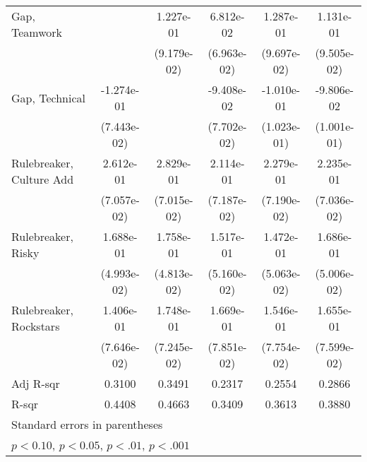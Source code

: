 {\begin{tabular}{l*{5}{c}}
    \addlinespace
    Gap, Teamwork            &                       & 1.227e-01             & 6.812e-02             & 1.287e-01             & 1.131e-01                   \\
                             &                       & (9.179e-02)           & (6.963e-02)           & (9.697e-02)           & (9.505e-02)                 \\
    \addlinespace
    Gap, Technical           & -1.274e-01\sym{+}     &                       & -9.408e-02            & -1.010e-01            & -9.806e-02                  \\
                             & (7.443e-02)           &                       & (7.702e-02)           & (1.023e-01)           & (1.001e-01)                 \\
    \addlinespace
    Rulebreaker, Culture Add & 2.612e-01\sym{**}     & 2.829e-01\sym{**}     & 2.114e-01\sym{*}      & 2.279e-01\sym{*}      & 2.235e-01\sym{*}            \\
                             & (7.057e-02)           & (7.015e-02)           & (7.187e-02)           & (7.190e-02)           & (7.036e-02)                 \\
    \addlinespace
    Rulebreaker, Risky       & 1.688e-01\sym{**}     & 1.758e-01\sym{**}     & 1.517e-01\sym{*}      & 1.472e-01\sym{*}      & 1.686e-01\sym{**}           \\
                             & (4.993e-02)           & (4.813e-02)           & (5.160e-02)           & (5.063e-02)           & (5.006e-02)                 \\
    \addlinespace
    Rulebreaker, Rockstars   & 1.406e-01\sym{+}      & 1.748e-01\sym{++}     & 1.669e-01\sym{++}     & 1.546e-01\sym{++}     & 1.655e-01\sym{++}           \\
                             & (7.646e-02)           & (7.245e-02)           & (7.851e-02)           & (7.754e-02)           & (7.599e-02)                 \\
    \midrule
    Adj R-sqr                & 0.3100                & 0.3491                & 0.2317                & 0.2554                & 0.2866                      \\
    R-sqr                    & 0.4408                & 0.4663                & 0.3409                & 0.3613                & 0.3880                      \\
    \bottomrule
    \multicolumn{6}{l}{\footnotesize Standard errors in parentheses}                                                                                       \\
    \multicolumn{6}{l}{\footnotesize \sym{+} \(p<0.10\), \sym{++} \(p<0.05\), \sym{*} \(p<.01\), \sym{**} \(p<.001\)}                                      \\
\end{tabular}
}
